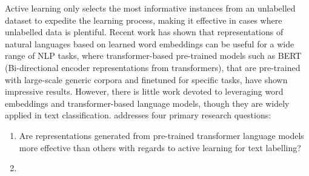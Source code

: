Active learning only selects the most informative instances from an unlabelled dataset
to expedite the learning process, making it effective in cases where unlabelled data is 
plentiful. Recent work has shown that representations of natural languages based on 
learned word embeddings can be useful for a wide range of NLP tasks, where 
transformer-based pre-trained models such as BERT (Bi-directional encoder representations 
from transformers), that are pre-trained with large-scale generic corpora and finetuned 
for specific tasks, have shown impressive results. However, there is little work devoted to 
leveraging word embeddings and transformer-based language models, though they are widely 
applied in text classification. \cite{lu2020investigating} addresses four primary research 
questions: 
\begin{enumerate}
    \item Are representations generated from pre-trained transformer language models more 
        effective than others with regards to active learning for text labelling?
    \item 
\end{enumerate}